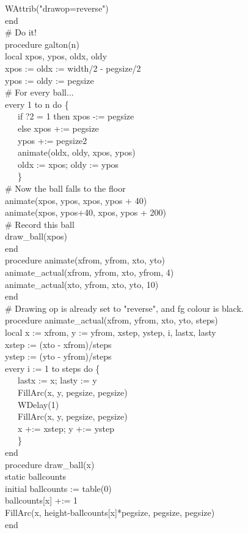 {\>   WAttrib("drawop=reverse") \\
end
\ \\
\# Do it! \\
procedure galton(n) \\
local xpos, ypos, oldx, oldy \\
\>   xpos := oldx := width/2 - pegsize/2 \\
\>   ypos := oldy := pegsize \\
\>   \# For every ball... \\
\>   every 1 to n do \{ \\
\>   \ \ \ if ?2 = 1 then xpos -:= pegsize \\
\>   \ \ \ else xpos +:= pegsize \\
\>   \ \ \ ypos +:= pegsize2 \\
\>   \ \ \ animate(oldx, oldy, xpos, ypos) \\
\>   \ \ \ oldx := xpos; oldy := ypos \\
\>   \ \ \ \} \\
\>   \# Now the ball falls to the floor \\
\>   animate(xpos, ypos, xpos, ypos + 40) \\
\>   animate(xpos, ypos+40, xpos, ypos + 200) \\
\>   \# Record this ball \\
\>   draw\_ball(xpos) \\
end
\ \\
procedure animate(xfrom, yfrom, xto, yto) \\
\>   animate\_actual(xfrom, yfrom, xto, yfrom, 4) \\
\>   animate\_actual(xto, yfrom, xto, yto, 10) \\
end
\ \\
\# Drawing op is already set to "reverse",
and fg colour is black. \\
procedure animate\_actual(xfrom, yfrom, xto, yto, steps) \\
local x := xfrom, y := yfrom, xstep, ystep, i, lastx, lasty \\
\>   xstep := (xto - xfrom)/steps \\
\>   ystep := (yto - yfrom)/steps \\
\>   every i := 1 to steps do \{ \\
\>   \ \ \ lastx := x; lasty := y \\
\>   \ \ \ FillArc(x, y, pegsize, pegsize) \\
\>   \ \ \ WDelay(1) \\
\>   \ \ \ FillArc(x, y, pegsize, pegsize) \\
\>   \ \ \ x +:= xstep; y +:= ystep \\
\>   \ \ \ \} \\
end
\ \\
procedure draw\_ball(x) \\
static ballcounts \\
initial ballcounts := table(0) \\
\>   ballcounts[x] +:= 1 \\
\>   FillArc(x, height-ballcounts[x]*pegsize, pegsize, pegsize) \\
end
}

